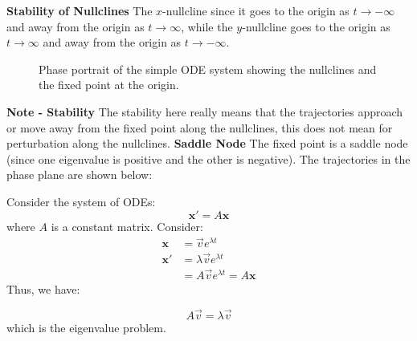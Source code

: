 \documentclass[11pt]{article}
\begin{document}
\begin{example}
    \textbf{Stability of Nullclines} The $x$-nullcline since it goes to the origin as $t \to -\infty$ and away from the origin as $t \to \infty$, while the $y$-nullcline goes to the origin as $t \to \infty$ and away from the origin as $t \to -\infty$. 
        \begin{figure}[h!]
            \centering
            \caption{Phase portrait of the simple ODE system showing the nullclines and the fixed point at the origin.}
        \end{figure}
        \textbf{Note - Stability} The stability here really means that the trajectories approach or move away from the fixed point along the nullclines, this does not mean for perturbation along the nullclines.
        \textbf{Saddle Node} The fixed point is a saddle node (since one eigenvalue is positive and the other is negative). The trajectories in the phase plane are shown below:
\end{example}

\begin{example}
    Consider the system of ODEs:
    $$
    \textbf{x}' = A\textbf{x}
    $$
    where \( A \) is a constant matrix. Consider:
    \begin{align*}
        \textbf{x} &= \vec{v} e^{\lambda t} \\
        \textbf{x}' &= \lambda \vec{v} e^{\lambda t} \\
        &= A\vec{v} e^{\lambda t} = A\textbf{x}
    \end{align*}
    Thus, we have:
    
    \begin{equation}
    A\vec{v} = \lambda \vec{v}
        \end{equation}
    which is the eigenvalue problem. 
\end{example}
\end{document}
